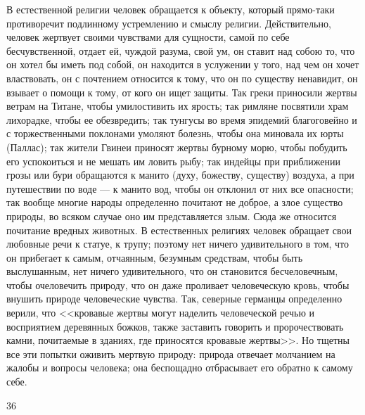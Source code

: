 \documentclass[12pt]{article}
\begin{document}
В естественной религии человек обращается к объекту, который прямо-таки противоречит подлинному устремлению и смыслу религии. Действительно, человек жертвует своими чувствами для сущности, самой по себе бесчувственной, отдает ей, чуждой разума, свой ум, он ставит над собою то, что он хотел бы иметь под собой, он находится в услужении у того, над чем он хочет властвовать, он с почтением относится к тому, что он по существу ненавидит, он взывает о помощи к тому, от кого он ищет защиты. Так греки приносили жертвы ветрам на Титане, чтобы умилостивить их ярость; так римляне посвятили храм лихорадке, чтобы ее обезвредить; так тунгусы во время эпидемий благоговейно и с торжественными поклонами умоляют болезнь, чтобы она миновала их юрты (Паллас); так жители Гвинеи приносят жертвы бурному морю, чтобы побудить его успокоиться и не мешать им ловить рыбу; так индейцы при приближении грозы или бури обращаются к манито (духу, божеству, существу) воздуха, а при путешествии по воде --- к манито вод, чтобы он отклонил от них все опасности; так вообще многие народы определенно почитают не доброе, а злое существо природы, во всяком случае оно им представляется злым. Сюда же относится почитание вредных животных. В естественных религиях человек обращает свои любовные речи к статуе, к трупу; поэтому нет ничего удивительного в том, что он прибегает к самым, отчаянным, безумным средствам, чтобы быть выслушанным, нет ничего удивительного, что он становится бесчеловечным, чтобы очеловечить природу, что он даже проливает человеческую кровь, чтобы внушить природе человеческие чувства. Так, северные германцы определенно верили, что <<кровавые жертвы могут наделить человеческой речью и восприятием деревянных божков, также заставить говорить и пророчествовать камни, почитаемые в зданиях, где приносятся кровавые жертвы>>. Но тщетны все эти попытки оживить мертвую природу: природа отвечает молчанием на жалобы и вопросы человека; она беспощадно отбрасывает его обратно к самому себе.

36
\end{document}
